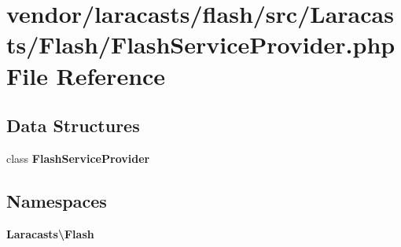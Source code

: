 \section{vendor/laracasts/flash/src/\+Laracasts/\+Flash/\+Flash\+Service\+Provider.php File Reference}
\label{_flash_service_provider_8php}
\subsection*{Data Structures}
\begin{DoxyCompactItemize}
\item 
class {\bf Flash\+Service\+Provider}
\end{DoxyCompactItemize}
\subsection*{Namespaces}
\begin{DoxyCompactItemize}
\item 
 {\bf Laracasts\textbackslash{}\+Flash}
\end{DoxyCompactItemize}
